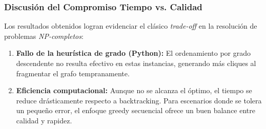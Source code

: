 \subsubsection{Discusión del Compromiso Tiempo vs. Calidad}

Los resultados obtenidos logran evidenciar el clásico \textit{trade-off} en la resolución de problemas \textit{NP-completos}: 

\begin{enumerate}
    \item \textbf{Fallo de la heurística de grado (Python):} El ordenamiento por grado descendente no resulta efectivo en estas instancias, generando más cliques al fragmentar el grafo tempranamente.

    \item \textbf{Eficiencia computacional:} Aunque no se alcanza el óptimo, el tiempo se reduce drásticamente respecto a backtracking. Para escenarios donde se tolera un pequeño error, el enfoque greedy secuencial ofrece un buen balance entre calidad y rapidez.
\end{enumerate}







